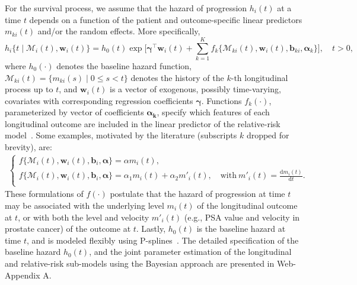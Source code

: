 For the survival process, we assume that the hazard of progression $h_i(t)$ at a time $t$ depends on a function of the patient and outcome-specific linear predictors $m_{ki}(t)$ and/or the random effects. More specifically,
\begin{equation*}
\label{eq:rel_risk_model}
h_i\big\{t \mid \mathcal{M}_i(t), \boldsymbol{w}_i(t)\big\} = h_0(t) \exp\Big[\boldsymbol{\gamma}^{\top}\boldsymbol{w}_i(t) + \sum_{k=1}^{K} f_{k} \big\{ \mathcal{M}_{ki}(t), \boldsymbol{w}_i(t), \boldsymbol{b}_{ki}, \boldsymbol{\alpha}_{k} \big\}\Big], \quad t>0,
\end{equation*}
where $h_0(\cdot)$ denotes the baseline hazard function, $\mathcal{M}_{ki}(t)=\{m_{ki}(s) \mid 0 \leq s < t \}$ denotes the history of the ${k\mbox{-th}}$ longitudinal process up to $t$, and $\boldsymbol{w}_i(t)$ is a vector of exogenous, possibly time-varying, covariates with corresponding regression coefficients $\boldsymbol{\gamma}$. Functions $f_{k}(\cdot)$, parameterized by vector of coefficients $\boldsymbol{\alpha_{k}}$, specify which features of each longitudinal outcome are included in the linear predictor of the relative-risk model~\citep{brown2009assessing,rizopoulos2012joint,taylor2013real}. Some examples, motivated by the literature (subscripts $k$ dropped for brevity), are:
\begin{eqnarray*}
\left \{
\begin{array}{l}
f\big\{\mathcal{M}_{i}(t), \boldsymbol{w}_i(t), \boldsymbol{b}_{i}, \boldsymbol{\alpha} \big\} = \alpha m_{i}(t),\\
f\big\{ \mathcal{M}_{i}(t), \boldsymbol{w}_i(t), \boldsymbol{b}_{i}, \boldsymbol{\alpha}\big\} = \alpha_1 m_{i}(t) + \alpha_2 m'_{i}(t),\quad \text{with}\  m'_{i}(t) = \frac{\mathrm{d}{m_{i}(t)}}{\mathrm{d}{t}}.\\
\end{array}
\right.
\end{eqnarray*}
These formulations of $f(\cdot)$ postulate that the hazard of progression at time $t$ may be associated with the underlying level $m_i(t)$ of the longitudinal outcome at $t$, or with both the level and velocity $m'_i(t)$ (e.g., PSA value and velocity in prostate cancer) of the outcome at $t$. Lastly, $h_0(t)$ is the baseline hazard at time $t$, and is modeled flexibly using P-splines~\citep{eilers1996flexible}. The detailed specification of the baseline hazard $h_0(t)$, and the joint parameter estimation of the longitudinal and relative-risk sub-models using the Bayesian approach are presented in Web-Appendix A.
